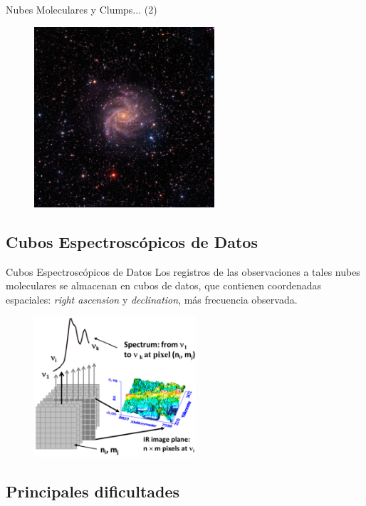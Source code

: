 \documentclass{beamer}
\begin{document}
\begin{frame}{Nubes Moleculares y Clumps... (2)}
\begin{figure}[htpb!]
\centering
\includegraphics[width=6.7cm]{NGC6946}
\end{figure}
\end{frame}



\subsection{Cubos Espectroscópicos de Datos}
\begin{frame}{Cubos Espectroscópicos de Datos}
Los registros de las observaciones a tales nubes moleculares se almacenan en cubos de datos, que contienen
coordenadas espaciales: \textit{right ascension} y \textit{declination}, más frecuencia observada.
\begin{figure}[htpb!]
\centering
\includegraphics[width=6cm]{cube}
\end{figure}
\end{frame}



\subsection{Principales dificultades}
\end{document}
